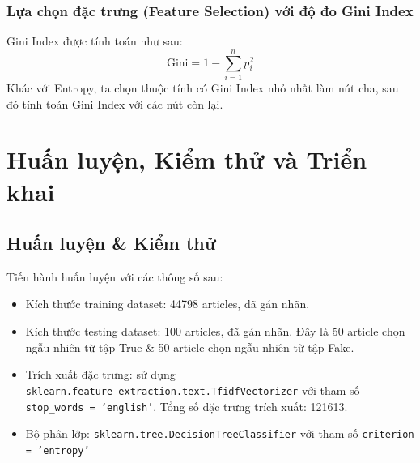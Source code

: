 \documentclass[12pt]{article}
\begin{document}
\subsubsection{Lựa chọn đặc trưng (Feature Selection) với độ đo Gini Index}
Gini Index được tính toán như sau:
$$
\text{Gini} = 1 - \sum_{i = 1}^n p_i ^ 2
$$
Khác với Entropy, ta chọn thuộc tính có Gini Index nhỏ nhất làm nút cha, sau đó tính toán Gini Index với các nút còn lại.

\section{Huấn luyện, Kiểm thử và Triển khai}

\subsection{Huấn luyện \& Kiểm thử}
Tiến hành huấn luyện với các thông số sau:
\begin{itemize}
\item Kích thước training dataset: 44798 articles, đã gán nhãn.
\item Kích thước testing dataset: 100 articles, đã gán nhãn. Đây là 50 article chọn ngẫu nhiên từ tập True \& 50 article chọn ngẫu nhiên từ tập Fake.
\item Trích xuất đặc trưng: sử dụng \texttt{sklearn.feature\_extraction.text.TfidfVectorizer} với tham số \texttt{stop\_words = 'english'}. Tổng số đặc trưng trích xuất: 121613.
\item Bộ phân lớp: \texttt{sklearn.tree.DecisionTreeClassifier} với tham số \texttt{criterion = 'entropy'} 
\end{itemize}
\end{document}
